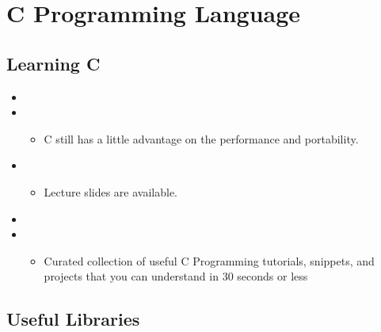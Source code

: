 \documentclass[letterpaper,10pt,english]{sphinxmanual}
\begin{document}
\section{C Programming Language}
\label{\detokenize{resource/programing/clang_basic:c-programming-language}}\label{\detokenize{resource/programing/clang_basic::doc}}

\subsection{Learning C}
\label{\detokenize{resource/programing/clang_basic:learning-c}}\begin{itemize}
\item {} 

\item {} 
\begin{itemize}
\item {} 
C still has a little advantage on the performance and portability.

\end{itemize}

\item {} 
\begin{itemize}
\item {} 
Lecture slides are available.

\end{itemize}

\item {} 

\item {} 
\begin{itemize}
\item {} 
Curated collection of useful C Programming tutorials, snippets,
and projects that you can understand in 30 seconds or less

\end{itemize}

\end{itemize}


\subsection{Useful Libraries}
\label{\detokenize{resource/programing/clang_basic:useful-libraries}}
\end{document}
